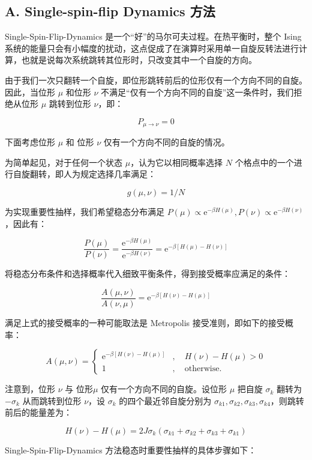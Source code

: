 \documentclass[aps,prl,twocolumn,groupedaddress]{revtex4-2}
\begin{document}
\subsection{A. Single-spin-flip Dynamics 方法}

Single-Spin-Flip-Dynamics 是一个“好”的马尔可夫过程。在热平衡时，整个 Ising 系统的能量只会有小幅度的扰动，这点促成了在演算时采用单一自旋反转法进行计算，也就是说每次系统跳转其位形时，只改变其中一个自旋的方向。

由于我们一次只翻转一个自旋，即位形跳转前后的位形仅有一个方向不同的自旋。因此，当位形 $\mu $ 和位形 $\nu $ 不满足“仅有一个方向不同的自旋”这一条件时，我们拒绝从位形 $\mu $ 跳转到位形 $\nu $，即：

$$
P_{\mu\to \nu}= 0
$$

下面考虑位形 $\mu $ 和 位形 $\nu $ 仅有一个方向不同的自旋的情况。

为简单起见，对于任何一个状态 $\mu $，认为它以相同概率选择 $N $ 个格点中的一个进行自旋翻转，即人为规定选择几率满足：

$$
g(\mu,\nu) = 1/N
$$

为实现重要性抽样，我们希望稳态分布满足 $P(\mu)\propto \mathrm{e}^{-\beta H(\mu)},P(\nu)\propto \mathrm{e}^{-\beta H(\nu)} $，因此有：

$$
\frac{P(\mu) }{P(\nu) } 
=\frac{\mathrm{e}^{-\beta H(\mu)} }{\mathrm{e}^{-\beta H(\nu)} } 
=\mathrm{e}^{-\beta \left[H(\mu)-H(\nu) \right]}
$$

将稳态分布条件和选择概率代入细致平衡条件，得到接受概率应满足的条件：

$$
\frac{A(\mu,\nu) }{A(\nu,\mu) } = \mathrm{e}^{-\beta \left[H(\nu)-H(\mu) \right]}
$$

满足上式的接受概率的一种可能取法是 Metropolis 接受准则，即如下的接受概率：

$$
A(\mu,\nu)
=\left\{
\begin{array}{ll}
\mathrm{e}^{-\beta\left[H(\nu)-H(\mu) \right]}&,\quad H(\nu)-H(\mu)>0 \\
1 &,\quad \mathrm{otherwise.}
\end{array}
\right.
$$

注意到，位形 $\nu $ 与 位形$\mu $ 仅有一个方向不同的自旋。设位形 $\mu$ 把自旋 $\sigma_k$ 翻转为 $-\sigma_k$ 从而跳转到位形 $\nu$，设 $\sigma_k $ 的四个最近邻自旋分别为 $\sigma_{k1},\sigma_{k2},\sigma_{k3},\sigma_{k4} $，则跳转前后的能量差为：

$$
H(\nu)-H(\mu)
=2J\sigma_k(\sigma_{k1}+\sigma_{k2}+\sigma_{k3}+\sigma_{k1})
$$

Single-Spin-Flip-Dynamics 方法稳态时重要性抽样的具体步骤如下：
\end{document}
